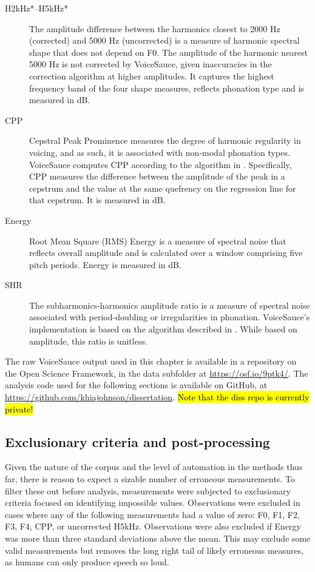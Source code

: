 \begin{description}
    \item[H2kHz*--H5kHz*] The amplitude difference between the harmonics closest to 2000 Hz (corrected) and 5000 Hz (uncorrected) is a measure of harmonic spectral shape that does not depend on F0. The amplitude of the harmonic nearest 5000 Hz is not corrected by VoiceSauce, given inaccuracies in the correction algorithm at higher amplitudes. It captures the highest frequency band of the four shape measures, reflects phonation type and is measured in dB.
    \item[CPP] Cepstral Peak Prominence measures the degree of harmonic regularity in voicing, and as such, it is associated with non-modal phonation types. VoiceSauce computes CPP according to the algorithm in \citet{hillenbrand_1994_acoustic}. Specifically, CPP measures the difference between the amplitude of the peak in a cepstrum and the value at the same quefrency on the regression line for that cepstrum. It is measured in dB.
    \item[Energy] Root Mean Square (RMS) Energy is a measure of spectral noise that reflects overall amplitude and is calculated over a window comprising five pitch periods. Energy is measured in dB.
    \item[SHR] The subharmonics-harmonics amplitude ratio is a measure of spectral noise associated with period-doubling or irregularities in phonation. VoiceSauce's implementation is based on the algorithm described in \cite{sun_2002_shr}. While based on amplitude, this ratio is unitless. 
\end{description}

The raw VoiceSauce output used in this chapter is available in a repository on the Open Science Framework, in the data subfolder at \url{https://osf.io/9ptk4/}. The analysis code used for the following sections is available on GitHub, at \url{https://github.com/khiajohnson/dissertation}. \hl{Note that the diss repo is currently private!}

\subsection{Exclusionary criteria and post-processing}

Given the nature of the corpus and the level of automation in the methods thus far, there is reason to expect a sizable number of erroneous measurements. To filter these out before analysis, measurements were subjected to exclusionary criteria focused on identifying impossible values. Observations were excluded in cases where any of the following measurements had a value of zero: F0, F1, F2, F3, F4, CPP, or uncorrected H5kHz. Observations were also excluded if Energy was more than three standard deviations above the mean. This may exclude some valid measurements but removes the long right tail of likely erroneous measures, as humans can only produce speech so loud. 

